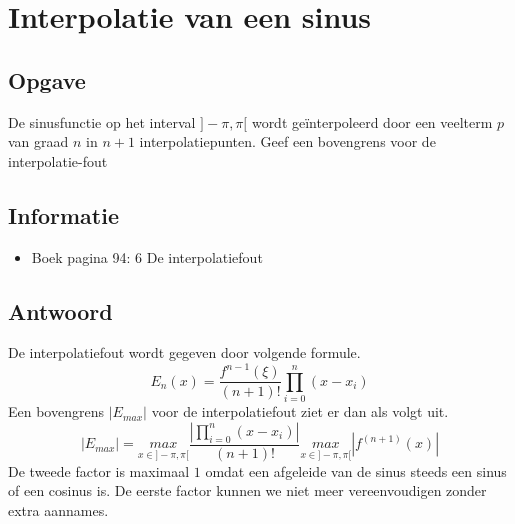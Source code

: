 \documentclass[examenvragen.tex]{subfiles}
\begin{document}
\section{Interpolatie van een sinus}
\subsection{Opgave}
De sinusfunctie op het interval $]-\pi,\pi[$ wordt ge\"interpoleerd door een veelterm $p$ van graad $n$ in $n+1$ interpolatiepunten.
Geef een bovengrens voor de interpolatie-fout

\subsection{Informatie}
\begin{itemize}
\item Boek pagina 94: 6 De interpolatiefout
\end{itemize}

\subsection{Antwoord}
De interpolatiefout wordt gegeven door volgende formule.
\[
E_{n}(x) = \frac{f^{n-1}(\xi)}{(n+1)!}\prod_{i=0}^{n}(x-x_i)
\]
Een bovengrens $|E_{max}|$ voor de interpolatiefout ziet er dan als volgt uit.
\[
|E_{max}| = \underset{x\in]-\pi,\pi[}{max}\frac{\left|\prod_{i=0}^{n}(x-x_i)\right|}{(n+1)!}\underset{x\in]-\pi,\pi[}{max}|f^{(n+1)}(x)|
\]
De tweede factor is maximaal $1$ omdat een afgeleide van de sinus steeds een sinus of een cosinus is.
De eerste factor kunnen we niet meer vereenvoudigen zonder extra aannames.
\end{document}
